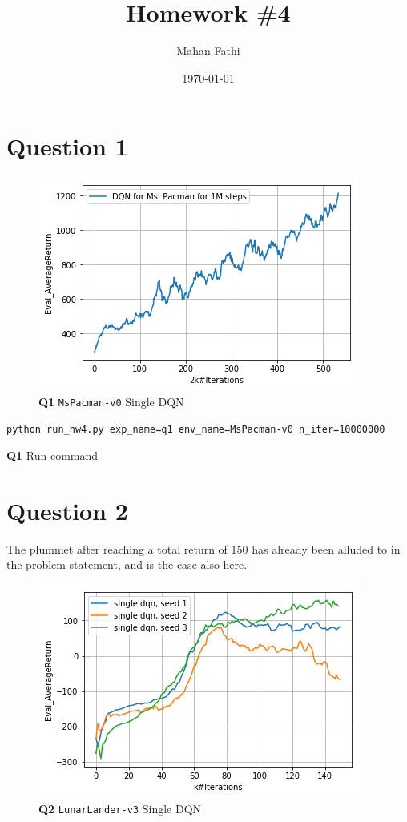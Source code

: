 \documentclass[11pt]{article}
\author{Mahan Fathi}
\date{\today}
\title{\textbf{Homework \#4}}
\begin{document}
\maketitle
\clearpage

\section{Question 1}
\label{sec:orgee87c1d}

\begin{figure}[htbp]
\centering
\includegraphics[width=.9\linewidth]{./1.png}
\caption{\textbf{Q1} \texttt{MsPacman-v0} Single DQN}
\end{figure}

\begin{listing}[htbp]
\begin{verbatim}
python run_hw4.py exp_name=q1 env_name=MsPacman-v0 n_iter=10000000
\end{verbatim}
\caption{\textbf{Q1} Run command}
\end{listing}

\clearpage

\section{Question 2}
\label{sec:orgcfb0e8a}
The plummet after reaching a total return of 150 has already been alluded to in the problem statement, and is the case also here.

\begin{figure}[htbp]
\centering
\includegraphics[width=.9\linewidth]{./21.png}
\caption{\textbf{Q2} \texttt{LunarLander-v3} Single DQN}
\end{figure}
\end{document}
